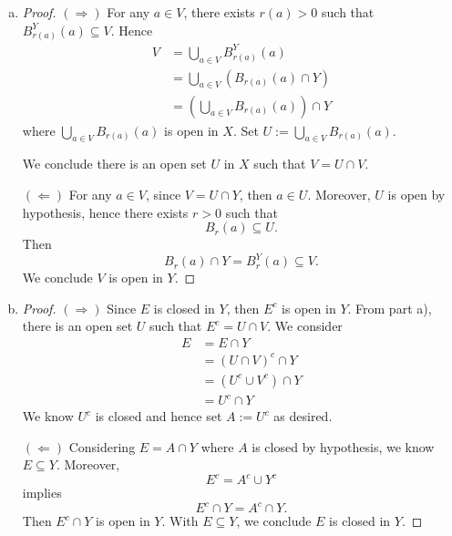 \begin{Exercise}
\begin{enumerate}[a)]
\item
\begin{proof}
$(\Longrightarrow)$
For any $a\in V$, there exists $r(a)>0$ such that $B_{r(a)}^Y(a)\subseteq V$. Hence
\begin{align*}
V
&= \bigcup_{a\in V}B_{r(a)}^Y(a) \\
&= \bigcup_{a\in V}\left( B_{r(a)}(a)\cap Y \right) \\
&= \left( \bigcup_{a\in V}B_{r(a)}(a) \right) \cap Y
\end{align*}
where $\bigcup_{a\in V}B_{r(a)}(a)$ is open in $X$.
Set $U := \bigcup_{a\in V}B_{r(a)}(a)$. 

We conclude there is an open set $U$ in $X$ such that $V=U\cap V$.

\vspace{2ex}

$(\Longleftarrow)$
For any $a\in V$, since $V=U\cap Y$, then $a\in U$. Moreover, $U$ is open by hypothesis, hence there exists $r>0$ such that 
$$
B_r(a)\subseteq U.
$$
Then
$$
B_r(a)\cap Y = B_r^Y(a) \subseteq V.
$$
We conclude $V$ is open in $Y$.
\end{proof}

\item
\begin{proof}
$(\Longrightarrow)$
Since $E$ is closed in $Y$, then $E^c$ is open in $Y$. From part a), there is an open set $U$ such that $E^c = U\cap V$. We consider
\begin{align*}
E
&= E\cap Y \\
&= \left( U\cap V \right)^c \cap Y \\
&= \left( U^c\cup V^c \right) \cap Y \\
&= U^c\cap Y
\end{align*}
We know $U^c$ is closed and hence set $A:=U^c$ as desired.

\vspace{2ex}

$(\Longleftarrow)$
Considering $E=A\cap Y$ where $A$ is closed by hypothesis, we know $E\subseteq Y$. Moreover, 
$$
E^c = A^c\cup Y^c
$$ 
implies 
$$
E^c\cap Y = A^c\cap Y.
$$
Then $E^c\cap Y$ is open in $Y$. With $E\subseteq Y$, we conclude $E$ is closed in $Y$.
\end{proof}
\end{enumerate}
\end{Exercise}